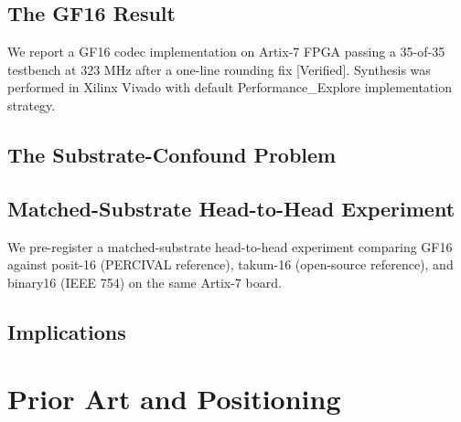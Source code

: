 \documentclass[conference]{IEEEtran}
\begin{document}
\subsection{The GF16 Result}
We report a GF16 codec implementation on Artix-7 FPGA passing a 35-of-35
testbench at 323 MHz after a one-line rounding fix [Verified]. Synthesis
was performed in Xilinx Vivado with default Performance\_Explore
implementation strategy. %

\subsection{The Substrate-Confound Problem}

\subsection{Matched-Substrate Head-to-Head Experiment}
\label{subsec:matched-substrate}
We pre-register a matched-substrate head-to-head experiment comparing
GF16 against posit-16 (PERCIVAL reference), takum-16 (open-source
reference), and binary16 (IEEE 754) on the same Artix-7 board.

\subsection{Implications}

\section{Prior Art and Positioning}
\label{sec:prior}


\end{document}
